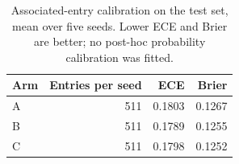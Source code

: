 \begin{table}[htbp]\centering\small
\caption{Associated-entry calibration on the test set, mean over five seeds. Lower ECE and Brier are better; no post-hoc probability calibration was fitted.}\label{tab:calibration}
\begin{tabular}{@{}lrrr@{}}\toprule
Arm & Entries per seed & ECE & Brier\\\midrule
A & 511 & 0.1803 & 0.1267\\
B & 511 & 0.1789 & 0.1255\\
C & 511 & 0.1798 & 0.1252\\
\bottomrule\end{tabular}\end{table}
